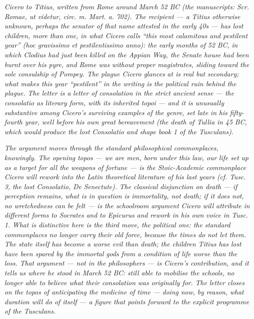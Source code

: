 
\textit{Cicero to Titius, written from Rome around March
52 BC (the manuscripts: \textit{Scr. Romae, ut videtur,
circ. m. Mart. a. 702}). The recipient --- a Titius
otherwise unknown, perhaps the senator of that name
attested in the early 40s --- has lost children, more
than one, in what Cicero calls ``this most calamitous
and pestilent year'' (\textit{hoc gravissimo et
pestilentissimo anno}): the early months of 52 BC, in
which Clodius had just been killed on the Appian Way,
the Senate house had been burnt over his pyre, and Rome
was without proper magistrates, sliding toward the sole
consulship of Pompey. The plague Cicero glances at is
real but secondary; what makes this year ``pestilent''
in the writing is the political ruin behind the plague.
The letter is a letter of consolation in the strict
ancient sense --- the \textit{consolatio} as literary
form, with its inherited topoi --- and it is unusually
substantive among Cicero's surviving examples of the
genre, set late in his fifty-fourth year, well before
his own great bereavement (the death of Tullia in 45
BC, which would produce the lost \textit{Consolatio} and
shape book 1 of the \textit{Tusculans}).}

\textit{The argument moves through the standard
philosophical commonplaces, knowingly. The opening
topos --- we are men, born under this law, our life set
up as a target for all the weapons of fortune --- is
the Stoic-Academic commonplace Cicero will rework into
the Latin theoretical literature of his last years (cf.
\textit{Tusc.} 3, the lost \textit{Consolatio},
\textit{De Senectute}). The classical disjunction on
death --- if perception remains, what is in question is
immortality, not death; if it does not, no wretchedness
can be felt --- is the schoolroom argument Cicero will
attribute in different forms to Socrates and to
Epicurus and rework in his own voice in
\textit{Tusc.} 1. What is distinctive here is the third
move, the political one: the standard commonplaces no
longer carry their old force, because the times do not
let them. The state itself has become a worse evil than
death; the children Titius has lost have been spared
\textit{by the immortal gods} from a condition of life
worse than the loss. That argument --- not in the
philosophers --- is Cicero's contribution, and it tells
us where he stood in March 52 BC: still able to
mobilise the schools, no longer able to believe what
their consolation was originally for. The letter closes
on the topos of \textit{anticipating} the medicine of
time --- doing now, by reason, what duration will do
of itself --- a figure that points forward to the
explicit programme of the \textit{Tusculans}.}

